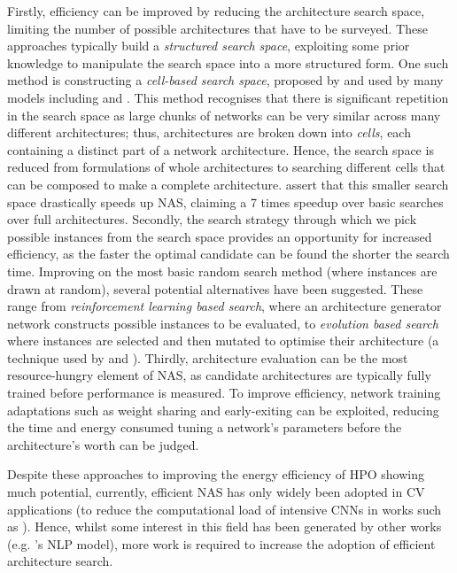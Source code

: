 \documentclass[a4paper, 12pt]{article}
\begin{document}
    Firstly, efficiency can be improved by reducing the architecture search space, limiting the number of possible architectures that have to be surveyed. These approaches typically build a \emph{structured search space}, exploiting some prior knowledge to manipulate the search space into a more structured form. One such method is constructing a \emph{cell-based search space}, proposed by  and used by many models including  and . This method recognises that there is significant repetition in the search space as large chunks of networks can be very similar across many different architectures; thus, architectures are broken down into \emph{cells}, each containing a distinct part of a network architecture. Hence, the search space is reduced from formulations of whole architectures to searching different cells that can be composed to make a complete architecture.  assert that this smaller search space drastically speeds up NAS, claiming a 7 times speedup over basic searches over full architectures. Secondly, the search strategy through which we pick possible instances from the search space provides an opportunity for increased efficiency, as the faster the optimal candidate can be found the shorter the search time. Improving on the most basic random search method (where instances are drawn at random), several potential alternatives have been suggested. These range from \emph{reinforcement learning based search}, where an architecture generator network constructs possible instances to be evaluated, to \emph{evolution based search} where instances are selected and then mutated to optimise their architecture (a technique used by  and ). Thirdly, architecture evaluation can be the most resource-hungry element of NAS, as candidate architectures are typically fully trained before performance is measured. To improve efficiency, network training adaptations such as weight sharing and early-exiting can be exploited, reducing the time and energy consumed tuning a network's parameters before the architecture's worth can be judged. 
    
    Despite these approaches to improving the energy efficiency of HPO showing much potential, currently, efficient NAS has only widely been adopted in CV applications (to reduce the computational load of intensive CNNs in works such as ). Hence, whilst some interest in this field has been generated by other works (e.g. 's NLP model), more work is required to increase the adoption of efficient architecture search.
\end{document}
